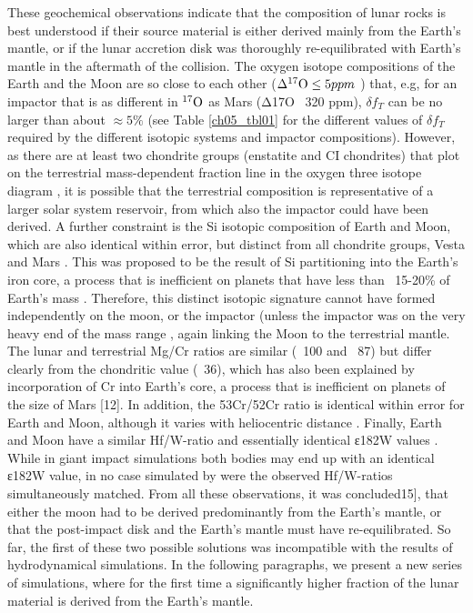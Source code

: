 These geochemical observations indicate that the composition of lunar rocks is best understood if their source material is either derived mainly from the Earth's mantle, or if the lunar accretion disk was thoroughly re-equilibrated with Earth's mantle in the aftermath of the collision. The oxygen isotope compositions of the Earth and the Moon are so close to each other ($\Delta \O17 \le 5 ppm$  \citep{Wiechert:2001p3543}) that, e.g, for an impactor that is as different in $\O17$ as Mars (Δ17O ~320 ppm), $\delta f_{T}$ can be no larger than about $\approx 5 \%$ (see Table \ref{ch05_tbl01} for the different values of $\delta f_{T}$ required by the different isotopic systems and impactor compositions). However, as there are at least two chondrite groups (enstatite and CI chondrites) that plot on the terrestrial mass-dependent fraction line in the oxygen three isotope diagram \citep{Clayton:1993p3544}, it is possible that the terrestrial composition is representative of a larger solar system reservoir, from which also the impactor could have been derived. A further constraint is the Si isotopic composition of Earth and Moon, which are also identical within error, but distinct from all chondrite groups, Vesta and Mars  \citep{2009E&PSL.287...77F, 2007Natur.447.1102G}. This was proposed to be the result of Si partitioning into the Earth's iron core, a process that is inefficient on planets that have less than ~15-20\% of  Earth's mass \citep{2005E&PSL.236...78W}. Therefore, this distinct isotopic signature cannot have formed independently on the moon, or the impactor (unless the impactor was on the very heavy end of the mass range \citep{Canup:2004p115}, again linking the Moon to the terrestrial mantle. The lunar and terrestrial Mg/Cr ratios are similar (~100 and ~87) but differ clearly from the chondritic value (~36), which has also been explained by incorporation of Cr into Earth's core, a process that is inefficient on planets of the size of Mars [12]. In addition, the 53Cr/52Cr ratio is identical within error for Earth and Moon, although it varies with heliocentric distance \citep{2000SSRv...92..225S}. Finally, Earth and Moon have a similar Hf/W-ratio and essentially identical ε182W values  \citep{2007Natur.450.1206T}. While in giant impact simulations both bodies may end up with an identical ε182W value, in no case simulated by  \citep{2010E&PSL.292..363N} were the observed Hf/W-ratios simultaneously matched. From all these observations, it was concluded15],  \citep{2011E&PSL.301..433P} that either the moon had to be derived predominantly from the Earth's mantle, or that the post-impact disk and the Earth's mantle must have re-equilibrated. So far, the first of these two possible solutions was incompatible with the results of hydrodynamical simulations. In the following paragraphs, we present a new series of simulations, where for the first time a significantly higher fraction of the lunar material is derived from the Earth's mantle.

